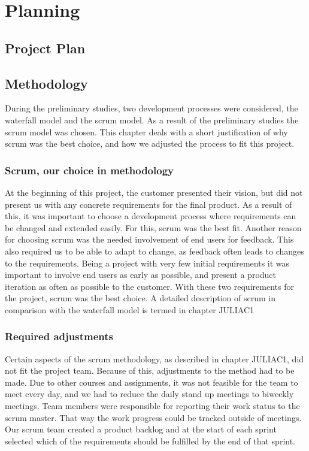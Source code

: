 \chapter{Planning}

\section{Project Plan}
\label{sec:IntroProjPlan}

\section{Methodology}
\label{sec:PlanningMethod}
During the preliminary studies, two development processes were considered, the waterfall model and the scrum model. As a result of the preliminary studies the scrum model was chosen. This chapter deals with a short justification of why scrum was the best choice, and how we adjusted the process to fit this project.

\subsection*{Scrum, our choice in methodology}
\label{subsec:PlanningMethodChoice}
At the beginning of this project, the customer presented their vision, but did not present us with any concrete requirements for the final product. As a result of this, it was important to choose a development process where requirements can be changed and extended easily. For this, scrum was the best fit. Another reason for choosing scrum was the needed involvement of end users for feedback. This also required us to be able to adapt to change, as feedback often leads to changes to the requirements. Being a project with very few initial requirements it was important to involve end users as early as possible, and present a  product iteration as often as possible to the customer. With these two requirements for the project, scrum was the best choice. A detailed description of scrum in comparison with the waterfall model is termed in chapter JULIAC1 %

\subsection*{Required adjustments}
\label{subsec:PlanningMethodAdjust}
Certain aspects of the scrum methodology, as described in chapter JULIAC1, did not fit the project team. Because of this, adjustments to the method had to be made. Due to other courses and assignments, it was not feasible for the team to meet every day, and we had to reduce the daily stand up meetings to biweekly meetings. Team members were responsible for reporting their work status to the scrum master. That way the work progress could be tracked outside of meetings. Our scrum team created a product backlog and at the start of each sprint selected which of the requirements should be fulfilled by the end of that sprint.

